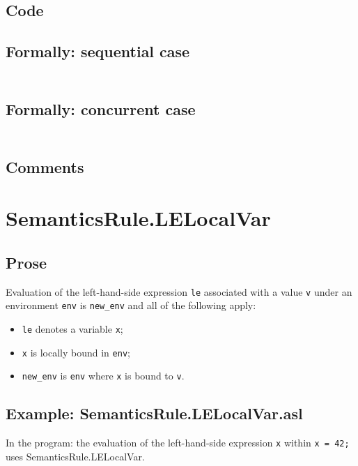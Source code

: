 \documentclass{book}
\begin{document}
  \subsection{Code}

  \subsection{Formally: sequential case}
  \begin{align}
  \end{align} 

  \subsection{Formally: concurrent case}
  \begin{align}
  \end{align} 

  \subsection{Comments}

\section{SemanticsRule.LELocalVar \label{sec:SemanticsRule.LELocalVar}}

    \subsection{Prose}
    Evaluation of the left-hand-side expression \texttt{le} associated with a
value \texttt{v} under an environment \texttt{env} is \texttt{new\_env} and all
of the following apply:
    \begin{itemize}
    \item \texttt{le} denotes a variable \texttt{x};
    \item \texttt{x} is locally bound in \texttt{env};
    \item \texttt{new\_env} is \texttt{env} where \texttt{x} is bound to \texttt{v}.
    \end{itemize}

    \subsection{Example: SemanticsRule.LELocalVar.asl}
    In the program:
    the evaluation of the left-hand-side expression \texttt{x} within \texttt{x = 42;} uses SemanticsRule.LELocalVar.
\end{document}
